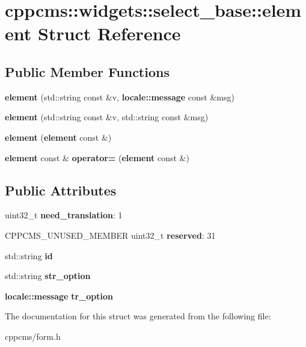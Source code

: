 \section{cppcms\+:\+:widgets\+:\+:select\+\_\+base\+:\+:element Struct Reference}
\label{structcppcms_1_1widgets_1_1select__base_1_1element}
\subsection*{Public Member Functions}
\begin{DoxyCompactItemize}
\item 
{\bfseries element} (std\+::string const \&v, {\bf locale\+::message} const \&msg)\label{structcppcms_1_1widgets_1_1select__base_1_1element_a2201a008a67419d33ddc6c141543ed6e}

\item 
{\bfseries element} (std\+::string const \&v, std\+::string const \&msg)\label{structcppcms_1_1widgets_1_1select__base_1_1element_a6a575261395968caa7086aaad3c7322c}

\item 
{\bfseries element} ({\bf element} const \&)\label{structcppcms_1_1widgets_1_1select__base_1_1element_a5cbd376bab3bc8c9efe56d4c41bf326f}

\item 
{\bf element} const \& {\bfseries operator=} ({\bf element} const \&)\label{structcppcms_1_1widgets_1_1select__base_1_1element_a5b9a12b09adef1c19ead2de703c26c59}

\end{DoxyCompactItemize}
\subsection*{Public Attributes}
\begin{DoxyCompactItemize}
\item 
uint32\+\_\+t {\bfseries need\+\_\+translation}\+: 1\label{structcppcms_1_1widgets_1_1select__base_1_1element_ac4a47dc24f69edf6aa32a34cf6040d7e}

\item 
C\+P\+P\+C\+M\+S\+\_\+\+U\+N\+U\+S\+E\+D\+\_\+\+M\+E\+M\+B\+ER uint32\+\_\+t {\bfseries reserved}\+: 31\label{structcppcms_1_1widgets_1_1select__base_1_1element_a0f31afbd3776e21c5dc7deb79047ddd2}

\item 
std\+::string {\bfseries id}\label{structcppcms_1_1widgets_1_1select__base_1_1element_adc7a822a128e5a77ef0dffa3c9bb1157}

\item 
std\+::string {\bfseries str\+\_\+option}\label{structcppcms_1_1widgets_1_1select__base_1_1element_a05a50952d7a19286f8fb671631b6983b}

\item 
{\bf locale\+::message} {\bfseries tr\+\_\+option}\label{structcppcms_1_1widgets_1_1select__base_1_1element_a81d4cfcdae5c17b6020bfbbfacc58e57}

\end{DoxyCompactItemize}


The documentation for this struct was generated from the following file\+:\begin{DoxyCompactItemize}
\item 
cppcms/form.\+h\end{DoxyCompactItemize}
